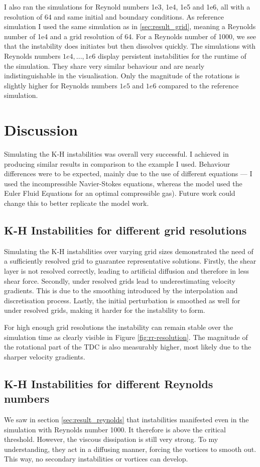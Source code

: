 \documentclass[a4paper,12pt]{article}
\begin{document}
I also ran the simulations for Reynold numbers 1e3, 1e4, 1e5 and 1e6, all with a resolution of 64 and same initial and boundary conditions.
As reference simulation I used the same simulation as in \ref{sec:result_grid}, meaning a Reynolds number of 1e4 and a grid resolution of 64.
For a Reynolds number of 1000, we see that the instability does initiates but then dissolves quickly.
The simulations with Reynolds numbers $1e4, ..., 1e6$ display persistent instabilities for the runtime of the simulation.
They share very similar behaviour and are nearly indistinguishable in the visualisation.
Only the magnitude of the rotations is slightly higher for Reynolds numbers $1e5$ and $1e6$ compared to the reference simulation.

\section{Discussion}
Simulating the \ac{K-H} instabilities was overall very successful.
I achieved in producing similar results in comparison to the example I used.
Behaviour differences were to be expected, mainly due to the use of different equations --- I used the incompressible Navier-Stokes equations, whereas the model used the Euler Fluid Equations for an optimal compressible gas).
Future work could change this to better replicate the model work.

\subsection{K-H Instabilities for different grid resolutions}
Simulating the \ac{K-H} instabilities over varying grid sizes demonstrated the need of a sufficiently resolved grid to guarantee representative solutions.
Firstly, the shear layer is not resolved correctly, leading to artificial diffusion and therefore in less shear force.
Secondly, under resolved grids lead to underestimating velocity gradients.
This is due to the smoothing introduced by the interpolation and discretisation process.
Lastly, the initial perturbation is smoothed as well for under resolved grids, making it harder for the instability to form.

For high enough grid resolutions the instability can remain stable over the simulation time as clearly visible in Figure \ref{fig:rr-resolution}.
The magnitude of the rotational part of the \ac{TDC} is also measurably higher, most likely due to the sharper velocity gradients.

\subsection{K-H Instabilities for different Reynolds numbers}
We saw in section \ref{sec:result_reynolds} that instabilities manifested even in the simulation with Reynolds number 1000.
It therefore is above the critical threshold.
However, the viscous dissipation is still very strong.
To my understanding, they act in a diffusing manner, forcing the vortices to smooth out.
This way, no secondary instabilities or vortices can develop.
\end{document}
